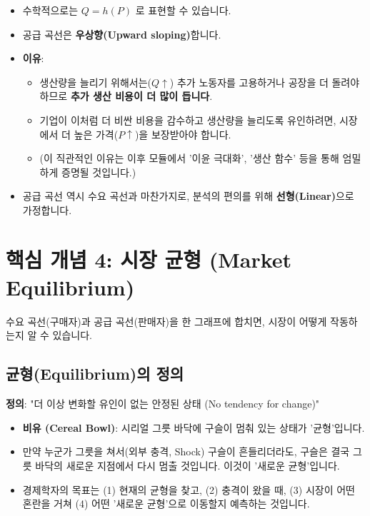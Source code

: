 \documentclass[11pt,a4paper]{book}
\theoremstyle{definition}
\begin{document}
\begin{itemize}
    \item 수학적으로는 $Q = h(P)$ 로 표현할 수 있습니다.
    \item 공급 곡선은 \textbf{우상향(Upward sloping)}합니다.
    \item \textbf{이유}:
        \begin{itemize}
            \item 생산량을 늘리기 위해서는($Q \uparrow$) 추가 노동자를 고용하거나 공장을 더 돌려야 하므로 \textbf{추가 생산 비용이 더 많이 듭니다}.
            \item 기업이 이처럼 더 비싼 비용을 감수하고 생산량을 늘리도록 유인하려면, 시장에서 더 높은 가격($P \uparrow$)을 보장받아야 합니다.
            \item (이 직관적인 이유는 이후 모듈에서 '이윤 극대화', '생산 함수' 등을 통해 엄밀하게 증명될 것입니다.)
        \end{itemize}
    \item 공급 곡선 역시 수요 곡선과 마찬가지로, 분석의 편의를 위해 \textbf{선형(Linear)}으로 가정합니다.
\end{itemize}


\section{핵심 개념 4: 시장 균형 (Market Equilibrium)}

수요 곡선(구매자)과 공급 곡선(판매자)을 한 그래프에 합치면, 시장이 어떻게 작동하는지 알 수 있습니다.

\subsection{균형(Equilibrium)의 정의}

\textbf{정의}: "더 이상 변화할 유인이 없는 안정된 상태 (No tendency for change)"

\begin{itemize}
    \item \textbf{비유 (Cereal Bowl)}: 시리얼 그릇 바닥에 구슬이 멈춰 있는 상태가 '균형'입니다.
    \item 만약 누군가 그릇을 쳐서(외부 충격, Shock) 구슬이 흔들리더라도, 구슬은 결국 그릇 바닥의 새로운 지점에서 다시 멈출 것입니다. 이것이 '새로운 균형'입니다.
    \item 경제학자의 목표는 (1) 현재의 균형을 찾고, (2) 충격이 왔을 때, (3) 시장이 어떤 혼란을 거쳐 (4) 어떤 '새로운 균형'으로 이동할지 예측하는 것입니다.
\end{itemize}
\end{document}
